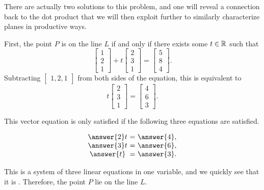 \documentclass{ximera}
\begin{document}
\begin{solution}
  There are actually two solutions to this problem, and one will reveal a connection back to the dot product that we will then exploit further to similarly characterize planes in productive ways.

  First, the point $P$ is on the line $L$ if and only if there exists some
  $t\in\mathbb{R}$ such that
  \begin{equation*}
    \begin{bmatrix} 1 \\ 2 \\ 1 \end{bmatrix}
    + t \begin{bmatrix} 2 \\ 3 \\ 1 \end{bmatrix}
    = \begin{bmatrix} 5 \\ 8 \\ 4 \end{bmatrix}.
  \end{equation*}
  Subtracting $\begin{bmatrix}1,2,1\end{bmatrix}$ from both sides of the equation, this is
  equivalent to
  \begin{equation*}
    t \begin{bmatrix} 2 \\ 3 \\ 1 \end{bmatrix}
    = \begin{bmatrix} 4 \\ 6 \\ 3 \end{bmatrix}.
  \end{equation*}

  This vector equation is only satisfied if the following three equations are satisfied.

  \begin{equation*}
    \begin{array}{c@{~}c@{~}l}
      \answer{2}t &=& \answer{4}, \\
      \answer{3}t &=& \answer{6}, \\
      \answer{t} &=& \answer{3}.
    \end{array}
  \end{equation*}

  This is a system of three linear equations in one variable, and we
  quickly see that it is . Therefore, the point $P$ 
  lie on the line $L$.

\end{solution}
\end{document}
